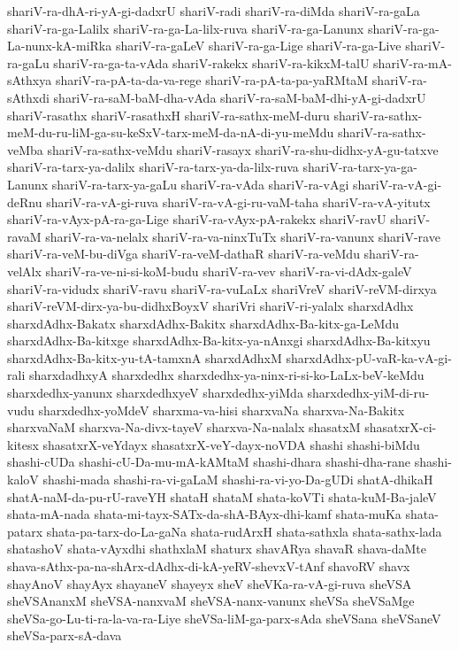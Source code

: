 {shariV-ra-dhA-ri-yA-gi-dadxrU
shariV-radi
shariV-ra-diMda
shariV-ra-gaLa
shariV-ra-ga-Lalilx
shariV-ra-ga-La-lilx-ruva
shariV-ra-ga-Lanunx
shariV-ra-ga-La-nunx-kA-miRka
shariV-ra-gaLeV
shariV-ra-ga-Lige
shariV-ra-ga-Live
shariV-ra-gaLu
shariV-ra-ga-ta-vAda
shariV-rakekx
shariV-ra-kikxM-talU
shariV-ra-mA-sAthxya
shariV-ra-pA-ta-da-va-rege
shariV-ra-pA-ta-pa-yaRMtaM
shariV-ra-sAthxdi
shariV-ra-saM-baM-dha-vAda
shariV-ra-saM-baM-dhi-yA-gi-dadxrU
shariV-rasathx
shariV-rasathxH
shariV-ra-sathx-meM-duru
shariV-ra-sathx-meM-du-ru-liM-ga-su-keSxV-tarx-meM-da-nA-di-yu-meMdu
shariV-ra-sathx-veMba
shariV-ra-sathx-veMdu
shariV-rasayx
shariV-ra-shu-didhx-yA-gu-tatxve
shariV-ra-tarx-ya-dalilx
shariV-ra-tarx-ya-da-lilx-ruva
shariV-ra-tarx-ya-ga-Lanunx
shariV-ra-tarx-ya-gaLu
shariV-ra-vAda
shariV-ra-vAgi
shariV-ra-vA-gi-deRnu
shariV-ra-vA-gi-ruva
shariV-ra-vA-gi-ru-vaM-taha
shariV-ra-vA-yitutx
shariV-ra-vAyx-pA-ra-ga-Lige
shariV-ra-vAyx-pA-rakekx
shariV-ravU
shariV-ravaM
shariV-ra-va-nelalx
shariV-ra-va-ninxTuTx
shariV-ra-vanunx
shariV-rave
shariV-ra-veM-bu-diVga
shariV-ra-veM-dathaR
shariV-ra-veMdu
shariV-ra-velAlx
shariV-ra-ve-ni-si-koM-budu
shariV-ra-vev
shariV-ra-vi-dAdx-galeV
shariV-ra-vidudx
shariV-ravu
shariV-ra-vuLaLx
shariVreV
shariV-reVM-dirxya
shariV-reVM-dirx-ya-bu-didhxBoyxV
shariVri
shariV-ri-yalalx
sharxdAdhx
sharxdAdhx-Bakatx
sharxdAdhx-Bakitx
sharxdAdhx-Ba-kitx-ga-LeMdu
sharxdAdhx-Ba-kitxge
sharxdAdhx-Ba-kitx-ya-nAnxgi
sharxdAdhx-Ba-kitxyu
sharxdAdhx-Ba-kitx-yu-tA-tamxnA
sharxdAdhxM
sharxdAdhx-pU-vaR-ka-vA-gi-rali
sharxdadhxyA
sharxdedhx
sharxdedhx-ya-ninx-ri-si-ko-LaLx-beV-keMdu
sharxdedhx-yanunx
sharxdedhxyeV
sharxdedhx-yiMda
sharxdedhx-yiM-di-ru-vudu
sharxdedhx-yoMdeV
sharxma-va-hisi
sharxvaNa
sharxva-Na-Bakitx
sharxvaNaM
sharxva-Na-divx-tayeV
sharxva-Na-nalalx
shasatxM
shasatxrX-ci-kitesx
shasatxrX-veYdayx
shasatxrX-veY-dayx-noVDA
shashi
shashi-biMdu
shashi-cUDa
shashi-cU-Da-mu-mA-kAMtaM
shashi-dhara
shashi-dha-rane
shashi-kaloV
shashi-mada
shashi-ra-vi-gaLaM
shashi-ra-vi-yo-Da-gUDi
shatA-dhikaH
shatA-naM-da-pu-rU-raveYH
shataH
shataM
shata-koVTi
shata-kuM-Ba-jaleV
shata-mA-nada
shata-mi-tayx-SATx-da-shA-BAyx-dhi-kamf
shata-muKa
shata-patarx
shata-pa-tarx-do-La-gaNa
shata-rudArxH
shata-sathxla
shata-sathx-lada
shatashoV
shata-vAyxdhi
shathxlaM
shaturx
shavARya
shavaR
shava-daMte
shava-sAthx-pa-na-shArx-dAdhx-di-kA-yeRV-shevxV-tAnf
shavoRV
shavx
shayAnoV
shayAyx
shayaneV
shayeyx
sheV
sheVKa-ra-vA-gi-ruva
sheVSA
sheVSAnanxM
sheVSA-nanxvaM
sheVSA-nanx-vanunx
sheVSa
sheVSaMge
sheVSa-go-Lu-ti-ra-la-va-ra-Liye
sheVSa-liM-ga-parx-sAda
sheVSana
sheVSaneV
sheVSa-parx-sA-dava
}
